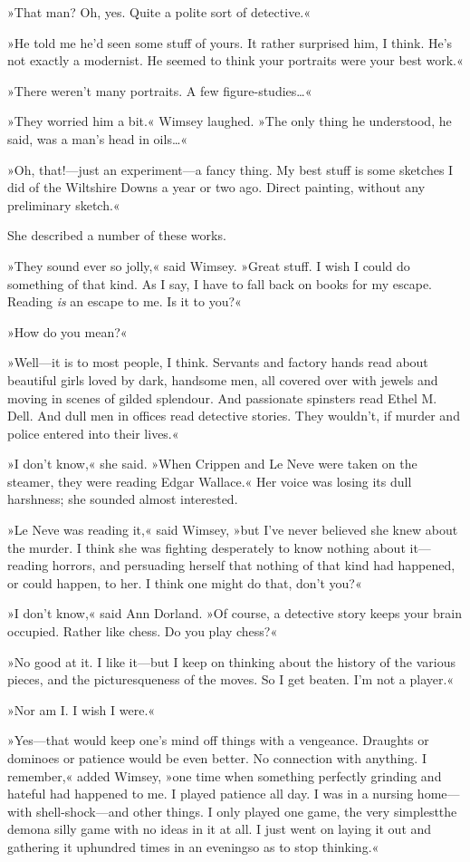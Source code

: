 »That man? Oh, yes. Quite a polite sort of detective.«

»He told me he'd seen some stuff of yours. It rather surprised him, I think. He's not exactly a modernist. He seemed to think your portraits were your best work.«

»There weren't many portraits. A few figure-studies\dots«

»They worried him a bit.« Wimsey laughed. »The only thing he understood, he said, was a man's head in oils\dots«

»Oh, that!—just an experiment—a fancy thing. My best stuff is some sketches I did of the Wiltshire Downs a year or two ago. Direct painting, without any preliminary sketch.«

She described a number of these works.

»They sound ever so jolly,« said Wimsey. »Great stuff. I wish I could do something of that kind. As I say, I have to fall back on books for my escape. Reading \textit{is} an escape to me. Is it to you?«

»How do you mean?«

»Well—it is to most people, I think. Servants and factory hands read about beautiful girls loved by dark, handsome men, all covered over with jewels and moving in scenes of gilded splendour. And passionate spinsters read Ethel M\@. Dell. And dull men in offices read detective stories. They wouldn't, if murder and police entered into their lives.«

»I don't know,« she said. »When Crippen and Le Neve were taken on the steamer, they were reading Edgar Wallace.« Her voice was losing its dull harshness; she sounded almost interested.

»Le Neve was reading it,« said Wimsey, »but I've never believed she knew about the murder. I think she was fighting desperately to know nothing about it—reading horrors, and persuading herself that nothing of that kind had happened, or could happen, to her. I think one might do that, don't you?«

»I don't know,« said Ann Dorland. »Of course, a detective story keeps your brain occupied. Rather like chess. Do you play chess?«

»No good at it. I like it—but I keep on thinking about the history of the various pieces, and the picturesqueness of the moves. So I get beaten. I'm not a player.«

»Nor am I\@. I wish I were.«

»Yes—that would keep one's mind off things with a vengeance. Draughts or dominoes or patience would be even better. No connection with anything. I remember,« added Wimsey, »one time when something perfectly grinding and hateful had happened to me. I played patience all day. I was in a nursing home—with shell-shock—and other things. I only played one game, the very simplest\textellipsis  the demon\textellipsis  a silly game with no ideas in it at all. I just went on laying it out and gathering it up\textellipsis  hundred times in an evening\textellipsis  so as to stop thinking.«


